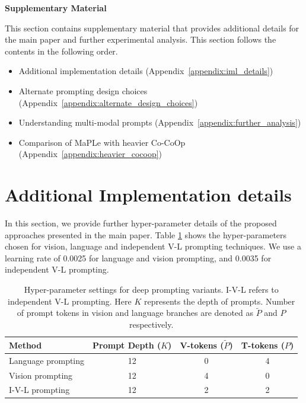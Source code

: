 \documentclass[10pt,twocolumn,letterpaper]{article}
\newcommand{\tablestyle}[2]{\setlength{\tabcolsep}{#1}\renewcommand{\arraystretch}{#2}\centering\footnotesize}
\begin{document}
{\small


}


\newpage
\newpage
\appendix


\begin{center}
\textbf{\Large Supplementary Material}
\end{center}

 \noindent This section contains supplementary material that provides additional details for the main paper and further experimental analysis. This section follows the contents in the following order.
\begin{itemize}
    \item Additional implementation details (Appendix~\ref{appendix:iml_details})
    \item Alternate prompting design choices (Appendix~\ref{appendix:alternate_design_choices})
    \item Understanding multi-modal prompts (Appendix~\ref{appendix:further_analysis})

    \item Comparison of MaPLe with heavier Co-CoOp (Appendix~\ref{appendix:heavier_cocoop})
\end{itemize}


\section{Additional Implementation details}
 \noindent In this section, we provide further hyper-parameter details of the proposed approaches presented in the main paper. Table \ref{table:hyper_parameter} shows the hyper-parameters chosen for vision, language and independent V-L prompting techniques. We use a learning rate of 0.0025 for language and vision prompting, and 0.0035 for independent V-L prompting.
\label{appendix:iml_details}


\begin{table}[h!]
\tablestyle{6pt}{1.1}
\addtolength{\tabcolsep}{-3pt}
\begin{tabular}{l ccc}
\toprule
Method  & Prompt Depth ($K$) & V-tokens ($\tilde{P}$) & T-tokens ($P$)\\
\midrule
Language prompting &	12 & 0 &	4\\
Vision prompting & 12 & 4 & 0\\
I-V-L prompting & 12 & 2 & 2\\
\bottomrule
\end{tabular}
\caption{
Hyper-parameter settings for deep prompting variants. I-V-L refers to independent V-L prompting. Here $K$ represents the depth of prompts. Number of prompt tokens in vision and language branches are denoted as $\tilde{P}$ and $P$ respectively.
} 
\label{table:hyper_parameter}
\end{table}
\end{document}
